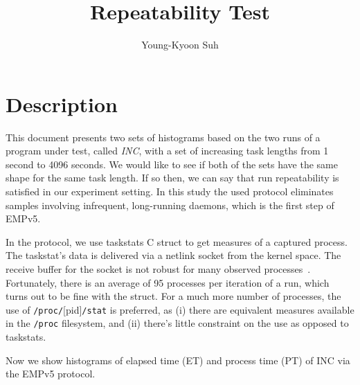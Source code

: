 \documentclass[10pt]{article}
\begin{document}
\title{Repeatability Test}

\author{
Young-Kyoon Suh\\
}
\maketitle

\section{Description}
This document presents two sets of histograms based on the two runs 
of a program under test, called {\em INC}, with a set of increasing task lengths 
from 1 second to 4096 seconds.
We would like to see if both of the sets have the same shape for the same task length.
If so then, we can say that run repeatability is satisfied in our experiment setting. 
In this study the used protocol eliminates samples involving infrequent, long-running daemons, 
which is the first step of EMPv5.

In the protocol, we use taskstats C struct to get measures of a captured process. 
The taskstat's data is delivered via a netlink socket from the kernel space. 
The receive buffer for the socket is not robust for many observed processes~\cite{Metrology}. 
Fortunately, there is an average of 95 processes per iteration of a run, 
which turns out to be fine with the struct. 
For a much more number of processes, 
the use of  {\tt /proc/}[pid]{\tt{/stat}} is preferred, 
as (i) there are equivalent measures available in the {\tt /proc} filesystem, 
and (ii) there's little constraint on the use as opposed to taskstats. 

Now we show histograms of elapsed time (ET) and process time (PT) of INC via the EMPv5 protocol.

\pagebreak



\pagebreak
\newpage



\pagebreak
\newpage



\pagebreak
\newpage



\pagebreak
\newpage


\end{document}
